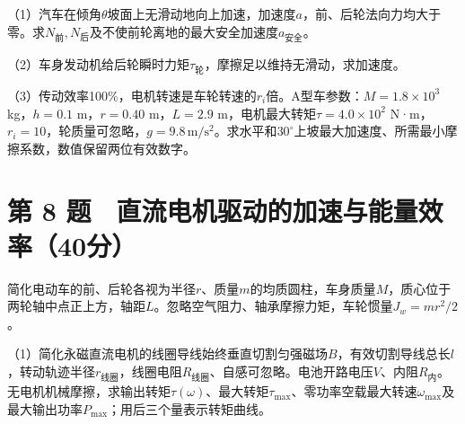 \documentclass[12pt,a4paper,fontset=fandol]{ctexart}
\begin{document}
\begin{center}
\begin{minipage}{\linewidth}
\centering\begingroup{}
\ifdim\wd\diagrambox>.88\linewidth
\sbox{\diagrambox}{\resizebox{.88\linewidth}{!}{\usebox{\diagrambox}}}\fi
\ifdim\ht\diagrambox>.20\textheight
\resizebox{!}{.20\textheight}{\usebox{\diagrambox}}
\else\usebox{\diagrambox}\fi
\par{}\endgroup\end{minipage}\end{center}

（1）汽车在倾角\(\theta\)坡面上无滑动地向上加速，加速度\(a\)，前、后轮法向力均大于零。求\(N_{\text{前}},N_{\text{后}}\)及不使前轮离地的最大安全加速度\(a_{\text{安全}}\)。

（2）车身发动机给后轮瞬时力矩\(\tau_{\text{轮}}\)，摩擦足以维持无滑动，求加速度。

（3）传动效率100\%，电机转速是车轮转速的\(r_i\)倍。A型车参数：\(M=1.8\times10^3\)
kg，\(h=0.1\) m，\(r=0.40\) m，\(L=2.9\)
m，电机最大转矩\(\tau=4.0\times10^2\)
N·m，\(r_i=10\)，轮质量可忽略，\(g=9.8\,\mathrm{m/s^2}\)。求水平和\(30^\circ\)上坡最大加速度、所需最小摩擦系数，数值保留两位有效数字。

\clearpage

\section{第 8
题　直流电机驱动的加速与能量效率（40分）}\label{ux7b2c-8-ux9898-ux76f4ux6d41ux7535ux673aux9a71ux52a8ux7684ux52a0ux901fux4e0eux80fdux91cfux6548ux738740ux5206}

简化电动车的前、后轮各视为半径\(r\)、质量\(m\)的均质圆柱，车身质量\(M\)，质心位于两轮轴中点正上方，轴距\(L\)。忽略空气阻力、轴承摩擦力矩，车轮惯量\(J_w=mr^2/2\)。

（1）简化永磁直流电机的线圈导线始终垂直切割匀强磁场\(B\)，有效切割导线总长\(l\)，转动轨迹半径\(r_{\text{线圈}}\)，线圈电阻\(R_{\text{线圈}}\)、自感可忽略。电池开路电压\(V\)、内阻\(R_{\text{内}}\)。无电机机械摩擦，求输出转矩\(\tau(\omega)\)、最大转矩\(\tau_{\max}\)、零功率空载最大转速\(\omega_{\max}\)及最大输出功率\(P_{\max}\)；用后三个量表示转矩曲线。
\end{document}
